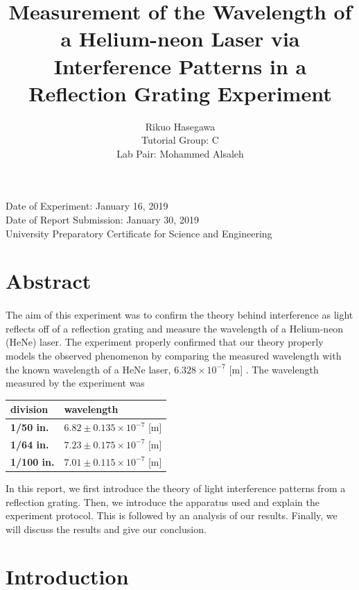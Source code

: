 \documentclass{article}
\title{Measurement of the Wavelength of a Helium-neon Laser via Interference Patterns in a Reflection Grating Experiment}
\author{ Rikuo Hasegawa \\ Tutorial Group: C \\ Lab Pair: Mohammed Alsaleh }
\begin{document}
\maketitle
\thispagestyle{fancy}
\vspace*{\fill}
\parbox{\linewidth}{\centering%
Date of Experiment: January 16, 2019
\\ Date of Report Submission: January 30, 2019
\\ University Preparatory Certificate for Science and Engineering
}
\newpage

\section*{Abstract}
\paragraph{}
The aim of this experiment was to confirm the theory behind interference as light reflects off of a reflection grating and measure the wavelength of a Helium-neon (HeNe) laser. The experiment properly confirmed that our theory properly models the observed phenomenon by comparing the measured wavelength with the known wavelength of a HeNe laser, $6.328 \times 10^{-7}$ [m] \autocite{WikiHeNe}. The wavelength measured by the experiment was

\begin{table}[H]
\begin{tabular}{|l|l|}
\hline
\textbf{division}  & \textbf{wavelength}                 \\ \hline
\textbf{1/50 in.}  & $6.82 \pm 0.135 \times 10^{-7}$ [m] \\ \hline
\textbf{1/64 in.}  & $7.23 \pm 0.175 \times 10^{-7}$ [m] \\ \hline
\textbf{1/100 in.} & $7.01 \pm 0.115 \times 10^{-7}$ [m] \\ \hline
\end{tabular}
\end{table}

In this report, we first introduce the theory of light interference patterns from a reflection grating. Then, we introduce the apparatus used and explain the experiment protocol. This is followed by an analysis of our results. Finally, we will discuss the results and give our conclusion.

\section{Introduction}
\end{document}
